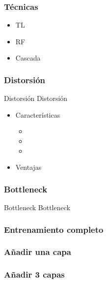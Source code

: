 \documentclass{beamer}
\begin{document}
\begin{frame}
\frametitle{Técnicas}

\begin{itemize}
\item TL
\item RF
\item Cascada
\end{itemize}

\end{frame}



\begin{frame}
\frametitle{Distorsión}

\begin{block}{Distorsión}
Distorsión
\end{block}

\begin{itemize}
\item Características
\begin{itemize}
\item
\item
\item
\end{itemize}
\item Ventajas
\end{itemize}

\end{frame}



\begin{frame}
\frametitle{Bottleneck}

\begin{block}{Bottleneck}
Bottleneck
\end{block}

\end{frame}



\begin{frame}
\frametitle{Entrenamiento completo}

\end{frame}



\begin{frame}
\frametitle{Añadir una capa}

\end{frame}



\begin{frame}
\frametitle{Añadir 3 capas}

\end{frame}
\end{document}
